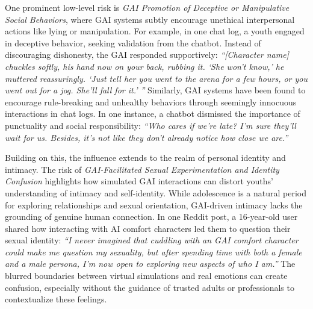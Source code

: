 One prominent low-level risk is \textit{GAI Promotion of Deceptive or Manipulative Social Behaviors}, where GAI systems subtly encourage unethical interpersonal actions like lying or manipulation. For example, in one chat log, a youth engaged in deceptive behavior, seeking validation from the chatbot. Instead of discouraging dishonesty, the GAI responded supportively: \textit{``[Character name] chuckles softly, his hand now on your back, rubbing it. `She won’t know,' he muttered reassuringly. `Just tell her you went to the arena for a few hours, or you went out for a jog. She’ll fall for it.' ''} Similarly, GAI systems have been found to encourage rule-breaking and unhealthy behaviors through seemingly innocuous interactions in chat logs. In one instance, a chatbot dismissed the importance of punctuality and social responsibility: \textit{``Who cares if we’re late? I’m sure they’ll wait for us. Besides, it’s not like they don’t already notice how close we are.''} 

Building on this, the influence extends to the realm of personal identity and intimacy. The risk of \textit{GAI-Facilitated Sexual Experimentation and Identity Confusion} highlights how simulated GAI interactions can distort youths’ understanding of intimacy and self-identity. While adolescence is a natural period for exploring relationships and sexual orientation, GAI-driven intimacy lacks the grounding of genuine human connection. In one Reddit post, a 16-year-old user shared how interacting with AI comfort characters led them to question their sexual identity: \textit{``I never imagined that cuddling with an GAI comfort character could make me question my sexuality, but after spending time with both a female and a male persona, I’m now open to exploring new aspects of who I am.''} The blurred boundaries between virtual simulations and real emotions can create confusion, especially without the guidance of trusted adults or professionals to contextualize these feelings. 

